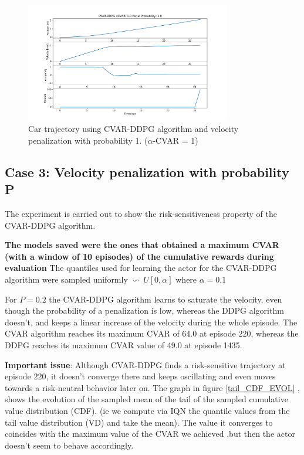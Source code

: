 \begin{figure}[ht]
        \centering
        \includegraphics[width=0.8\textwidth]{images/Car/CVAR/Trajectory_CVAR_ppenal1.pdf}
        \caption{Car trajectory using CVAR-DDPG algorithm and velocity penalization with probability 1. ($\alpha$-CVAR = 1)}
        \label{traj_cvarddpg_probpenal1_cvar1}
    
\end{figure}

\newpage
\subsection{Case 3: Velocity penalization with probability P }
The experiment is carried out to show the risk-sensitiveness property of the CVAR-DDPG algorithm.

\textbf{The models saved were the ones that obtained a maximum CVAR (with a window of 
10 episodes) of the cumulative rewards during evaluation}
The quantiles used for learning the actor for the CVAR-DDPG algorithm were sampled
uniformly $\backsim\ U[0,\alpha] $ where $\alpha=0.1$


For $P=0.2$ the CVAR-DDPG algorithm learns to saturate the velocity, even though the
probability of a penalization is low, whereas the DDPG algorithm doesn't, and keeps a
linear increase of the velocity during the whole episode.
The CVAR algorithm reaches its maximum CVAR of 64.0 at episode 220, whereas the DDPG
reaches its maximum CVAR value of 49.0 at episode 1435.

\textbf{Important issue}: Although CVAR-DDPG finds a risk-sensitive trajectory at
episode 220, it doesn't converge there and keeps oscillating and even moves towards a
risk-neutral behavior later on.
The graph in figure \ref{tail_CDF_EVOL} , shows the evolution of the sampled mean of the
tail of the sampled cumulative value distribution (CDF). (ie we compute via IQN the
quantile values from the tail value distribution (VD) and take the mean).
The value it converges to coincides with the maximum value of the CVAR we achieved ,but
then the actor doesn't seem to behave accordingly.


